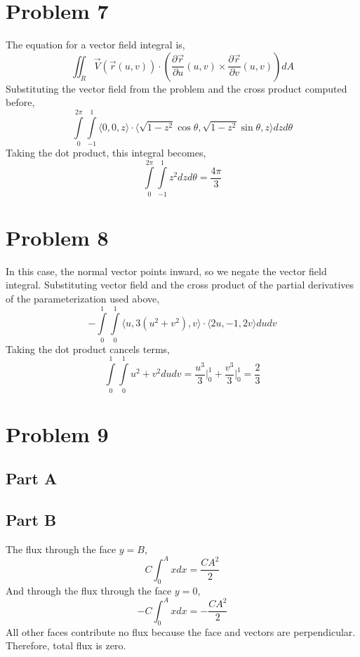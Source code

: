 \documentclass{article}
\begin{document}
\section*{Problem 7}

The equation for a vector field integral is,
$$ \iint_R \vec{V}(\vec{r}(u, v)) \cdot \left(\frac{\partial \vec{r}}{\partial
u}(u, v) \times \frac{\partial \vec{r}}{\partial v}(u, v) \right) dA $$
Substituting the vector field from the problem and the cross product computed
before,
$$ \int\limits_0^{2\pi}\int\limits_{-1}^1 \langle 0, 0, z \rangle \cdot \langle
\sqrt{1 - z^2} \cos \theta, \sqrt{1 - z^2} \sin \theta, z \rangle dz d\theta $$
Taking the dot product, this integral becomes,
$$ \int\limits_0^{2\pi}\int\limits_{-1}^1 z^2 dz d\theta = \frac{4\pi}{3} $$

\section*{Problem 8}

In this case, the normal vector points inward, so we negate the vector field
integral. Substituting vector field and the cross product of the partial
derivatives of the parameterization used above,
$$ -\int\limits_0^1\int\limits_0^1 \langle u, 3(u^2 + v^2), v \rangle \cdot
\langle 2u, -1, 2v \rangle du dv $$
Taking the dot product cancels terms,
$$ \int\limits_0^1\int\limits_0^1 u^2 + v^2 du dv = \frac{u^3}{3} \bigg\vert_0^1
+ \frac{v^3}{3} \bigg\vert_0^1 = \frac{2}{3} $$

\section*{Problem 9}

\subsection*{Part A}


\subsection*{Part B}

The flux through the face $y = B$,
$$ C \int_0^A x dx = \frac{C A^2}{2} $$
And through the flux through the face $y = 0$,
$$ - C\int_0^A x dx = -\frac{C A^2}{2} $$
All other faces contribute no flux because the face and vectors are
perpendicular. Therefore, total flux is zero.
\end{document}
